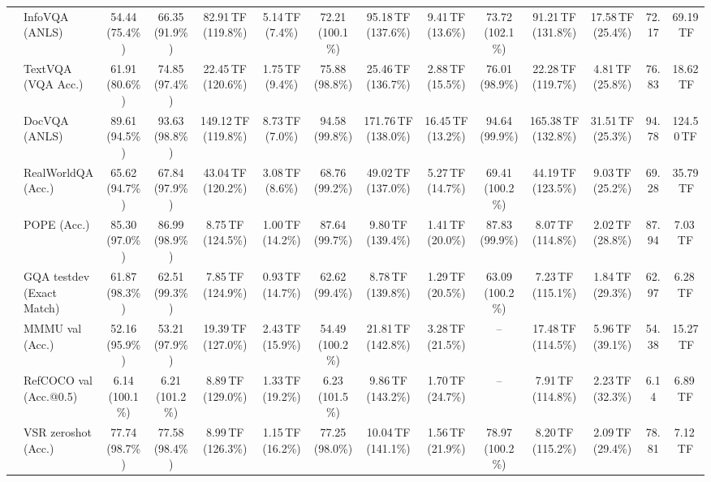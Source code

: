 \begin{table}[t]
\begin{center}
\begin{small}
\begin{sc}
{\begin{tabular}{llcccccccccccc}
& InfoVQA (ANLS) & 54.44 (75.4\%) & 66.35 (91.9\%) & 82.91\,TF (119.8\%) & 5.14\,TF (7.4\%) & \cellcolor{gray!15}72.21 (100.1\%) & 95.18\,TF (137.6\%) & 9.41\,TF (13.6\%) & \cellcolor{gray!15}73.72 (102.1\%) & 91.21\,TF (131.8\%) & 17.58\,TF (25.4\%) & 72.17 & 69.19\,TF \\
& TextVQA (VQA Acc.) & 61.91 (80.6\%) & 74.85 (97.4\%) & 22.45\,TF (120.6\%) & 1.75\,TF (9.4\%) & \cellcolor{gray!15}75.88 (98.8\%) & 25.46\,TF (136.7\%) & 2.88\,TF (15.5\%) & \cellcolor{gray!15}76.01 (98.9\%) & 22.28\,TF (119.7\%) & 4.81\,TF (25.8\%) & 76.83 & 18.62\,TF \\
& DocVQA (ANLS) & 89.61 (94.5\%) & \cellcolor{gray!15}93.63 (98.8\%) & 149.12\,TF (119.8\%) & 8.73\,TF (7.0\%) & \cellcolor{gray!15}94.58 (99.8\%) & 171.76\,TF (138.0\%) & 16.45\,TF (13.2\%) & \cellcolor{gray!15}94.64 (99.9\%) & 165.38\,TF (132.8\%) & 31.51\,TF (25.3\%) & 94.78 & 124.50\,TF \\
& RealWorldQA (Acc.) & 65.62 (94.7\%) & 67.84 (97.9\%) & 43.04\,TF (120.2\%) & 3.08\,TF (8.6\%) & \cellcolor{gray!15}68.76 (99.2\%) & 49.02\,TF (137.0\%) & 5.27\,TF (14.7\%) & \cellcolor{gray!15}69.41 (100.2\%) & 44.19\,TF (123.5\%) & 9.03\,TF (25.2\%) & 69.28 & 35.79\,TF \\
& POPE (Acc.) & 85.30 (97.0\%) & \cellcolor{gray!15}86.99 (98.9\%) & 8.75\,TF (124.5\%) & 1.00\,TF (14.2\%) & \cellcolor{gray!15}87.64 (99.7\%) & 9.80\,TF (139.4\%) & 1.41\,TF (20.0\%) & \cellcolor{gray!15}87.83 (99.9\%) & 8.07\,TF (114.8\%) & 2.02\,TF (28.8\%) & 87.94 & 7.03\,TF \\
& GQA testdev (Exact Match) & 61.87 (98.3\%) & \cellcolor{gray!15}62.51 (99.3\%) & 7.85\,TF (124.9\%) & 0.93\,TF (14.7\%) & \cellcolor{gray!15}62.62 (99.4\%) & 8.78\,TF (139.8\%) & 1.29\,TF (20.5\%) & \cellcolor{gray!15}63.09 (100.2\%) & 7.23\,TF (115.1\%) & 1.84\,TF (29.3\%) & 62.97 & 6.28\,TF \\
& MMMU val (Acc.) & 52.16 (95.9\%) & 53.21 (97.9\%) & 19.39\,TF (127.0\%) & 2.43\,TF (15.9\%) & \cellcolor{gray!15}54.49 (100.2\%) & 21.81\,TF (142.8\%) & 3.28\,TF (21.5\%) & -- & 17.48\,TF (114.5\%) & 5.96\,TF (39.1\%) & 54.38 & 15.27\,TF \\
& RefCOCO val (Acc.@0.5) & 6.14 (100.1\%) & \cellcolor{gray!15}6.21 (101.2\%) & 8.89\,TF (129.0\%) & 1.33\,TF (19.2\%) & \cellcolor{gray!15}6.23 (101.5\%) & 9.86\,TF (143.2\%) & 1.70\,TF (24.7\%) & -- & 7.91\,TF (114.8\%) & 2.23\,TF (32.3\%) & 6.14 & 6.89\,TF \\
& VSR zeroshot (Acc.) & 77.74 (98.7\%) & \cellcolor{gray!15}77.58 (98.4\%) & 8.99\,TF (126.3\%) & 1.15\,TF (16.2\%) & \cellcolor{gray!15}77.25 (98.0\%) & 10.04\,TF (141.1\%) & 1.56\,TF (21.9\%) & \cellcolor{gray!15}78.97 (100.2\%) & 8.20\,TF (115.2\%) & 2.09\,TF (29.4\%) & 78.81 & 7.12\,TF \\

\end{tabular}}
\end{sc}
\end{small}
\end{center}
\end{table}
